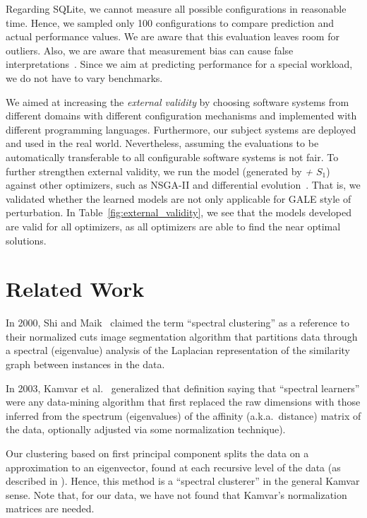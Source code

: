 Regarding SQLite, we cannot measure all possible configurations in reasonable time. Hence, we sampled only 100 configurations to compare prediction and actual performance values. We are aware that this evaluation leaves room for outliers.
Also, we are aware that measurement bias can cause false interpretations~\cite{me12d}. Since we aim at predicting performance for a special workload, we do not have to vary benchmarks.



  We aimed at increasing the {\em external validity} by choosing software systems from different domains with different configuration mechanisms and implemented with different programming languages. Furthermore, our subject systems  are deployed and used in the real world. Nevertheless, assuming the evaluations to be automatically transferable  to all configurable software systems is not fair. To further strengthen external validity, we run the model (generated by \textit{\what + $S_1$}) against other optimizers, such as NSGA-II and differential evolution~\cite{storn1997differential}. That is, we validated whether the learned models are not only applicable for GALE style of perturbation. In Table~\ref{fig:external_validity}, we see that the models developed are valid for all optimizers, as all optimizers are able to find the near optimal solutions.



\section{Related Work}
\label{sect:related}
 
In 2000, Shi and Maik~\cite{shi00} claimed the term ``spectral clustering'' as a reference to their normalized cuts
image
segmentation algorithm that  partitions data through a spectral (eigenvalue) analysis of the  
Laplacian representation of the similarity graph between instances in the data.

In 2003, Kamvar et al.~\cite{kamvar2003spectral}  generalized that definition saying that ``spectral learners''
were any data-mining algorithm that first replaced the raw
dimensions with those inferred from the spectrum (eigenvalues) of the affinity (a.k.a.\ distance)
matrix of the data, optionally adjusted via some normalization technique).

Our clustering based on first principal component splits the data on a   approximation to an eigenvector, found at each recursive level
of the data (as described in ). 
Hence, this  method is a ``spectral clusterer'' in the general Kamvar sense. 
Note that,
for our data, we have
not found that Kamvar's normalization matrices are needed.

